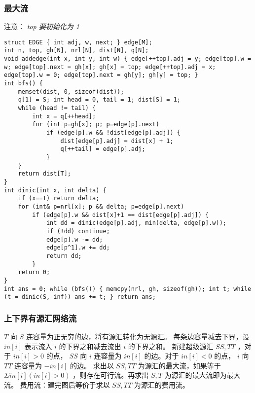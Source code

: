 \documentclass[landscape,a4paper]{article}
\begin{document}
\subsubsection{最大流}
注意： \emph{top 要初始化为 1}
\begin{lstlisting}
struct EDGE { int adj, w, next; } edge[M];
int n, top, gh[N], nrl[N], dist[N], q[N];
void addedge(int x, int y, int w) { edge[++top].adj = y; edge[top].w = w; edge[top].next = gh[x]; gh[x] = top; edge[++top].adj = x; edge[top].w = 0; edge[top].next = gh[y]; gh[y] = top; }
int bfs() {
	memset(dist, 0, sizeof(dist));
	q[1] = S; int head = 0, tail = 1; dist[S] = 1;
	while (head != tail) {
		int x = q[++head];
		for (int p=gh[x]; p; p=edge[p].next)
			if (edge[p].w && !dist[edge[p].adj]) {
				dist[edge[p].adj] = dist[x] + 1;
				q[++tail] = edge[p].adj;
			}
	}
	return dist[T];
}
int dinic(int x, int delta) {
	if (x==T) return delta;
	for (int& p=nrl[x]; p && delta; p=edge[p].next)
		if (edge[p].w && dist[x]+1 == dist[edge[p].adj]) {
			int dd = dinic(edge[p].adj, min(delta, edge[p].w));
			if (!dd) continue;
			edge[p].w -= dd;
			edge[p^1].w += dd;
			return dd;
		}
	return 0;
}
int ans = 0; while (bfs()) { memcpy(nrl, gh, sizeof(gh)); int t; while (t = dinic(S, inf)) ans += t; } return ans;
\end{lstlisting}
\subsubsection{上下界有源汇网络流}

$T$ 向 $S$ 连容量为正无穷的边，将有源汇转化为无源汇。
每条边容量减去下界，设 $in[i]$ 表示流入 $i$ 的下界之和减去流出 $i$ 的下界之和。  
新建超级源汇 $SS, TT$ ，对于 $in[i] > 0$ 的点， $SS$ 向 $i$ 连容量为 $in[i]$ 的边。对于 $in[i] < 0$ 的点， $i$ 向 $TT$ 连容量为 $-in[i]$ 的边。 
求出以 $SS, TT$ 为源汇的最大流，如果等于 $\Sigma in[i] (in[i]>0)$ ，则存在可行流。再求出 $S, T$ 为源汇的最大流即为最大流。 
费用流：建完图后等价于求以 $SS, TT$ 为源汇的费用流。
\end{document}
